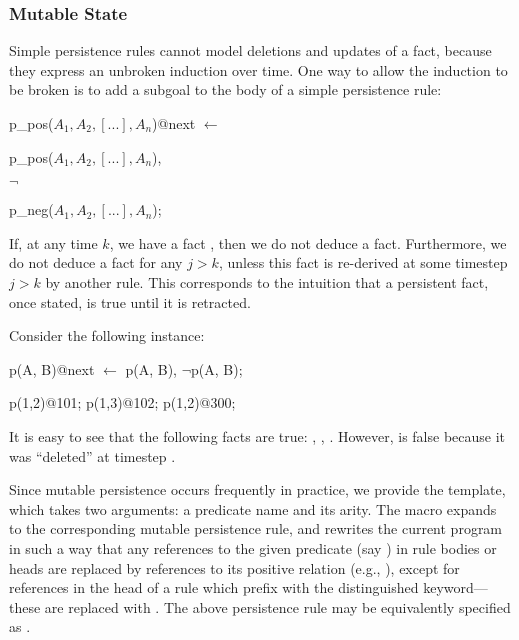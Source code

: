 \subsubsection{Mutable State}
\label{sec:mutable}

Simple persistence rules cannot model deletions and updates of a fact, because
they express an unbroken induction over time.  One way to allow the induction
to be broken is to add a   subgoal to the body of a simple
persistence rule:

\begin{dedalus}
p\_pos($A_1,A_2,[...],A_n$)@next $\leftarrow$
\end{dedalus}

\hspace{5mm}
\begin{dedalus}
p\_pos($A_1,A_2,[...],A_n$),
\end{dedalus}

\hspace{5mm}
$\lnot$
\begin{dedalus}
p\_neg($A_1,A_2,[...],A_n$);
\end{dedalus}

\noindent If, at any time $k$, we have a fact
, then we do not deduce a
 fact.  Furthermore, we do not deduce a
 fact for any $j > k$, unless this
 fact is re-derived at some timestep $j > k$ by another rule.
This corresponds to the intuition that a persistent fact, once stated, is true
until it is retracted.

\begin{example}
Consider the following \lang instance:

\begin{Dedalus}
p\pos(A, B)@next \(\leftarrow\) p\pos(A, B), \(\lnot\)p\nega(A, B);

p(1,2)@101;
p(1,3)@102;
p\nega(1,2)@300;
\end{Dedalus}

It is easy to see that the following facts are true: ,
, .  However,  is
false because it was ``deleted'' at timestep .
\end{example}

Since mutable persistence occurs frequently in practice, we provide the
 template, which takes two arguments: a predicate name and
its arity.  The macro expands to the corresponding mutable persistence rule,
and rewrites the current program in such a way that any references to the given
predicate (say ) in rule bodies or heads are replaced by references
to its positive relation (e.g., ), except for references in the
head of a rule which prefix  with the distinguished 
keyword---these are replaced with .  The above
 persistence rule may be equivalently specified as
.

